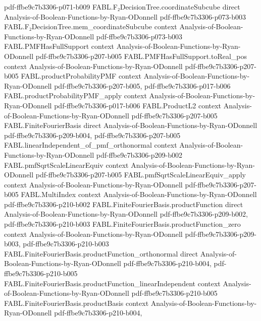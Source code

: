 \begin{theorem}
  {pdf-ffbe9c7b3306-p071-b009}
\proofstep
  {FABL.F₂DecisionTree.coordinateSubcube}
  {direct}
  {Analysis-of-Boolean-Functions-by-Ryan-ODonnell}
  {pdf-ffbe9c7b3306-p073-b003}
\proofstep
  {FABL.F₂DecisionTree.mem_coordinateSubcube}
  {context}
  {Analysis-of-Boolean-Functions-by-Ryan-ODonnell}
  {pdf-ffbe9c7b3306-p073-b003}
\proofstep
  {FABL.PMFHasFullSupport}
  {context}
  {Analysis-of-Boolean-Functions-by-Ryan-ODonnell}
  {pdf-ffbe9c7b3306-p207-b005}
\proofstep
  {FABL.PMFHasFullSupport.toReal_pos}
  {context}
  {Analysis-of-Boolean-Functions-by-Ryan-ODonnell}
  {pdf-ffbe9c7b3306-p207-b005}
\proofstep
  {FABL.productProbabilityPMF}
  {context}
  {Analysis-of-Boolean-Functions-by-Ryan-ODonnell}
  {pdf-ffbe9c7b3306-p207-b005,
    pdf-ffbe9c7b3306-p017-b006}
\proofstep
  {FABL.productProbabilityPMF_apply}
  {context}
  {Analysis-of-Boolean-Functions-by-Ryan-ODonnell}
  {pdf-ffbe9c7b3306-p017-b006}
\proofstep
  {FABL.ProductL2}
  {context}
  {Analysis-of-Boolean-Functions-by-Ryan-ODonnell}
  {pdf-ffbe9c7b3306-p207-b005}
\proofstep
  {FABL.FiniteFourierBasis}
  {direct}
  {Analysis-of-Boolean-Functions-by-Ryan-ODonnell}
  {pdf-ffbe9c7b3306-p209-b004,
    pdf-ffbe9c7b3306-p207-b005}
\proofstep
  {FABL.linearIndependent_of_pmf_orthonormal}
  {context}
  {Analysis-of-Boolean-Functions-by-Ryan-ODonnell}
  {pdf-ffbe9c7b3306-p209-b002}
\proofstep
  {FABL.pmfSqrtScaleLinearEquiv}
  {context}
  {Analysis-of-Boolean-Functions-by-Ryan-ODonnell}
  {pdf-ffbe9c7b3306-p207-b005}
\proofstep
  {FABL.pmfSqrtScaleLinearEquiv_apply}
  {context}
  {Analysis-of-Boolean-Functions-by-Ryan-ODonnell}
  {pdf-ffbe9c7b3306-p207-b005}
\proofstep
  {FABL.MultiIndex}
  {context}
  {Analysis-of-Boolean-Functions-by-Ryan-ODonnell}
  {pdf-ffbe9c7b3306-p210-b002}
\proofstep
  {FABL.FiniteFourierBasis.productFunction}
  {direct}
  {Analysis-of-Boolean-Functions-by-Ryan-ODonnell}
  {pdf-ffbe9c7b3306-p209-b002,
    pdf-ffbe9c7b3306-p210-b003}
\proofstep
  {FABL.FiniteFourierBasis.productFunction_zero}
  {context}
  {Analysis-of-Boolean-Functions-by-Ryan-ODonnell}
  {pdf-ffbe9c7b3306-p209-b003,
    pdf-ffbe9c7b3306-p210-b003}
\proofstep
  {FABL.FiniteFourierBasis.productFunction_orthonormal}
  {direct}
  {Analysis-of-Boolean-Functions-by-Ryan-ODonnell}
  {pdf-ffbe9c7b3306-p210-b004,
    pdf-ffbe9c7b3306-p210-b005}
\proofstep
  {FABL.FiniteFourierBasis.productFunction_linearIndependent}
  {context}
  {Analysis-of-Boolean-Functions-by-Ryan-ODonnell}
  {pdf-ffbe9c7b3306-p210-b005}
\proofstep
  {FABL.FiniteFourierBasis.productBasis}
  {context}
  {Analysis-of-Boolean-Functions-by-Ryan-ODonnell}
  {pdf-ffbe9c7b3306-p210-b004,
}
\end{theorem}
